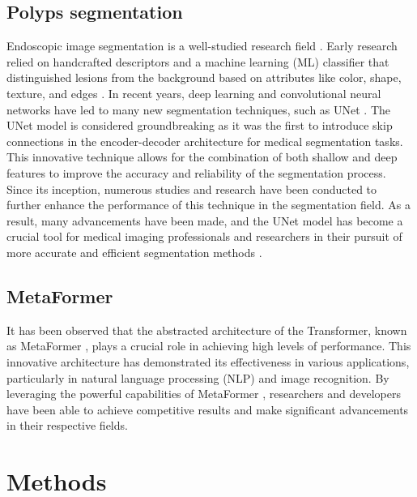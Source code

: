 \documentclass[conference]{IEEEtran}
\begin{document}
\subsection{Polyps segmentation}
Endoscopic image segmentation is a well-studied research field \cite{endoscopic}. Early research relied on handcrafted descriptors and a machine learning (ML) classifier that distinguished lesions from the background based on attributes like color, shape, texture, and edges \cite{lowperformance}. In recent years, deep learning and convolutional neural networks have led to many new segmentation techniques, such as UNet \cite{unet}. The UNet \cite{unet} model is considered groundbreaking as it was the first to introduce skip connections in the encoder-decoder architecture for medical segmentation tasks. This innovative technique allows for the combination of both shallow and deep features to improve the accuracy and reliability of the segmentation process. Since its inception, numerous studies and research have been conducted to further enhance the performance of this technique in the segmentation field. As a result, many advancements have been made, and the UNet \cite{unet} model has become a crucial tool for medical imaging professionals and researchers in their pursuit of more accurate and efficient segmentation methods \cite{resunet,jha2019resunet++}. 


\subsection{MetaFormer}
It has been observed that the abstracted architecture of the Transformer, known as MetaFormer \cite{metaformer}, plays a crucial role in achieving high levels of performance. This innovative architecture has demonstrated its effectiveness in various applications, particularly in natural language processing (NLP) and image recognition. By leveraging the powerful capabilities of MetaFormer \cite{metaformer}, researchers and developers have been able to achieve competitive results and make significant advancements in their respective fields.

\section{Methods}
\end{document}

